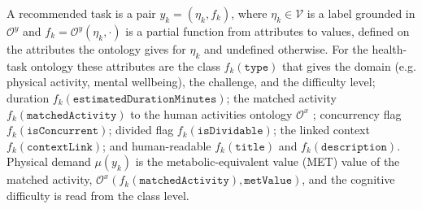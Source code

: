 \documentclass[runningheads]{llncs}
\begin{document}




A recommended task is a pair $y_k=(\eta_k,f_k)$, where $\eta_k\in\mathcal{V}$ is a label grounded in $\mathcal{O}^{y}$ and $f_k=\mathcal{O}^{y}(\eta_k,\cdot)$ is a partial function from attributes to values, defined on the attributes the ontology gives for $\eta_k$ and undefined otherwise. For the health-task ontology these attributes are the class $f_k(\texttt{type})$ that gives the domain (e.g. physical activity, mental wellbeing), the challenge, and the difficulty level; duration $f_k(\texttt{estimatedDurationMinutes})$; the matched activity $f_k(\texttt{matchedActivity})$ to the human activities ontology $\mathcal{O}^{x}$ \citep{compendium}; concurrency flag $f_k(\texttt{isConcurrent})$; divided flag $f_k(\texttt{isDividable})$; the linked context $f_k(\texttt{contextLink})$; and human-readable $f_k(\texttt{title})$ and $f_k(\texttt{description})$. Physical demand $\mu(y_k)$ is the metabolic-equivalent value (MET) value of the matched activity, $\mathcal{O}^{x}(f_k(\texttt{matchedActivity}),\texttt{metValue})$, and the cognitive difficulty is read from the class level. 
\end{document}
